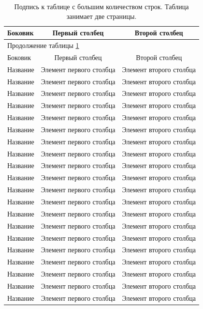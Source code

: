 \begin{longtable}{|l|c|c|}
\caption{Подпись к таблице с большим количеством строк. Таблица занимает две страницы.}
\label{tab:long}
 \\ \hline
Боковик & Первый столбец & Второй столбец \\ \hline
		\endfirsthead
\multicolumn{3}{l}{Продолжение таблицы \ref{tab:long}}
\\ \hline
Боковик & Первый столбец & Второй столбец \\ \hline
		\endhead
		\endfoot
	\hline  \endlastfoot

Название & Элемент первого столбца & Элемент второго столбца \\
Название & Элемент первого столбца & Элемент второго столбца \\
Название & Элемент первого столбца & Элемент второго столбца \\
Название & Элемент первого столбца & Элемент второго столбца \\
Название & Элемент первого столбца & Элемент второго столбца \\
Название & Элемент первого столбца & Элемент второго столбца \\
Название & Элемент первого столбца & Элемент второго столбца \\
Название & Элемент первого столбца & Элемент второго столбца \\
Название & Элемент первого столбца & Элемент второго столбца \\
Название & Элемент первого столбца & Элемент второго столбца \\
Название & Элемент первого столбца & Элемент второго столбца \\
Название & Элемент первого столбца & Элемент второго столбца \\
Название & Элемент первого столбца & Элемент второго столбца \\
Название & Элемент первого столбца & Элемент второго столбца \\
Название & Элемент первого столбца & Элемент второго столбца \\
Название & Элемент первого столбца & Элемент второго столбца \\
Название & Элемент первого столбца & Элемент второго столбца \\
Название & Элемент первого столбца & Элемент второго столбца \\
Название & Элемент первого столбца & Элемент второго столбца \\
Название & Элемент первого столбца & Элемент второго столбца \\

\end{longtable}
